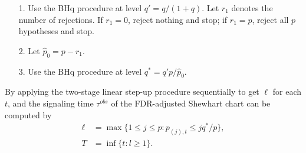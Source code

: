\documentclass[]{interact}
\theoremstyle{plain}%
\theoremstyle{definition}
\theoremstyle{remark}
\providecommand{\tightlist}{%
  \setlength{\itemsep}{0pt}\setlength{\parskip}{0pt}}
\begin{document}
\begin{itemize}
\tightlist
\item[1.]
Use the BHq procedure at level $q' = q / (1+q)$. Let $r_1$ denotes the number of rejections. If $r_1=0$, reject nothing and stop; if $r_1=p$, reject all $p$ hypotheses and stop.
\item[2.]
Let $\hat{p}_0 = p - r_1$.
\item[3.]
Use the BHq procedure at level $q^*=q' p / \hat{p}_0$.
\end{itemize}
By applying the two-stage linear step-up procedure sequentially to get $\ell$ for each $t$, and the signaling time $\tau^{obs}$ of the FDR-adjusted Shewhart chart can be computed by 
\begin{equation}\label{sigtime}
\begin{split}
\ell &= \max\{1\leq j\leq p:p_{(j),t}\leq jq^*/p\}, \\
T &= \inf \{t: l \ge 1\}.
\end{split}
\end{equation}
\end{document}
